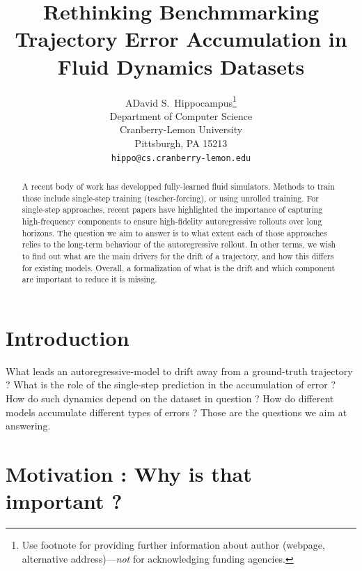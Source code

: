 \documentclass{article}
\title{Rethinking Benchmmarking Trajectory Error Accumulation in Fluid Dynamics Datasets}
\author{%
  ADavid S.~Hippocampus\thanks{Use footnote for providing further information
    about author (webpage, alternative address)---\emph{not} for acknowledging
    funding agencies.} \\
  Department of Computer Science\\
  Cranberry-Lemon University\\
  Pittsburgh, PA 15213 \\
  \texttt{hippo@cs.cranberry-lemon.edu} \\
}
\begin{document}
\maketitle


\begin{abstract}
A recent body of work has developped fully-learned fluid simulators. Methods to train those include single-step training (teacher-forcing), or using unrolled training. For single-step approaches, recent papers have highlighted the importance of capturing high-frequency components to ensure high-fidelity autoregressive rollouts over long horizons.
The question we aim to answer is to what extent each of those approaches relies to the long-term behaviour of the autoregressive rollout. In other terms, we wish to find out what are the main drivers for the drift of a trajectory, and how this differs for existing models. Overall, a formalization of what is the drift and which component are important to reduce it is missing.
\end{abstract}

\section{Introduction}

What leads an autoregressive-model to drift away from a ground-truth trajectory ? What is the role of the single-step prediction in the accumulation of error ? How do such dynamics depend on the dataset in question ? How do different models accumulate different types of errors ? Those are the questions we aim at answering.

\section{Motivation : Why is that important ?}
\end{document}
